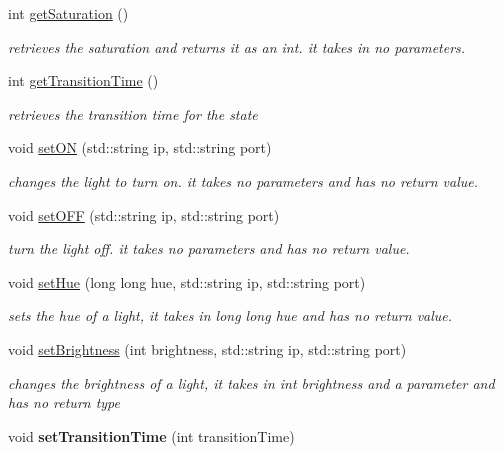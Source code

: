 \begin{DoxyCompactItemize}
int \hyperlink{class_state_aacba45740c95cd6a8efa6a441e90b1f4}{get\+Saturation} ()
\begin{DoxyCompactList}\small\item\em retrieves the saturation and returns it as an int. it takes in no parameters. \end{DoxyCompactList}\item 
int \hyperlink{class_state_ac91f9f2eb66b235470e54dbeec0bc3da}{get\+Transition\+Time} ()
\begin{DoxyCompactList}\small\item\em retrieves the transition time for the state \end{DoxyCompactList}\item 
void \hyperlink{class_state_a01a82c054b5a252942247dd89fc0aabe}{set\+ON} (std\+::string ip, std\+::string port)
\begin{DoxyCompactList}\small\item\em changes the light to turn on. it takes no parameters and has no return value. \end{DoxyCompactList}\item 
void \hyperlink{class_state_af2ff926d083755dc5c0efe8c115817b6}{set\+O\+FF} (std\+::string ip, std\+::string port)
\begin{DoxyCompactList}\small\item\em turn the light off. it takes no parameters and has no return value. \end{DoxyCompactList}\item 
void \hyperlink{class_state_a7fdaf261372291d6bbabfa9ed19fb44a}{set\+Hue} (long long hue, std\+::string ip, std\+::string port)
\begin{DoxyCompactList}\small\item\em sets the hue of a light, it takes in long long hue and has no return value. \end{DoxyCompactList}\item 
void \hyperlink{class_state_a58b256ffbe7d3475ac808a7f3d3214c0}{set\+Brightness} (int brightness, std\+::string ip, std\+::string port)
\begin{DoxyCompactList}\small\item\em changes the brightness of a light, it takes in int brightness and a parameter and has no return type \end{DoxyCompactList}\item 
\mbox{\label{class_state_aaedeb7634466d1f6e572e54537055b03}} 
void {\bfseries set\+Transition\+Time} (int transition\+Time)
\end{DoxyCompactItemize}
